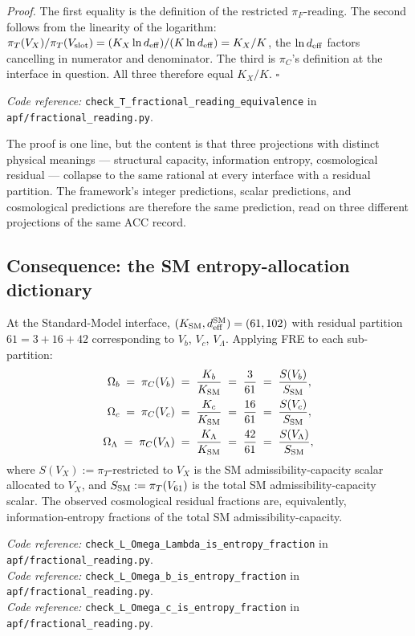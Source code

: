 \documentclass[11pt]{article}
\newcommand{\coderef}[2]{\smallskip\noindent\textit{Code reference:} \texttt{#1} in \texttt{#2}.}
\begin{document}
\noindent\textit{Proof.} The first equality is the definition of the restricted $\pi_F$-reading. The second follows from the linearity of the logarithm: $\pi_T(V_X)/\pi_T(V_{\rm slot}) = (K_X \ln d_{\rm eff})/(K \ln d_{\rm eff}) = K_X/K$, the $\ln d_{\rm eff}$ factors cancelling in numerator and denominator. The third is $\pi_C$'s definition at the interface in question. All three therefore equal $K_X/K$. \hfill$\square$

\smallskip

\coderef{check\_T\_fractional\_reading\_equivalence}{apf/fractional\_reading.py}

The proof is one line, but the content is that three projections with distinct physical meanings --- structural capacity, information entropy, cosmological residual --- collapse to the same rational at every interface with a residual partition. The framework's integer predictions, scalar predictions, and cosmological predictions are therefore the same prediction, read on three different projections of the same ACC record.

\subsection{Consequence: the SM entropy-allocation dictionary}\label{sec:FRE_SM_dictionary}

At the Standard-Model interface, $(K_{\rm SM}, d_{\rm eff}^{\rm SM}) = (61, 102)$ with residual partition $61 = 3 + 16 + 42$ corresponding to $V_b$, $V_c$, $V_\Lambda$. Applying FRE to each sub-partition:
\begin{align*}
\Omega_b       \;=\; \pi_C(V_b)       \;&=\; \frac{K_b}{K_{\rm SM}}       \;=\; \frac{3}{61}  \;=\; \frac{S(V_b)}{S_{\rm SM}}, \\
\Omega_c       \;=\; \pi_C(V_c)       \;&=\; \frac{K_c}{K_{\rm SM}}       \;=\; \frac{16}{61} \;=\; \frac{S(V_c)}{S_{\rm SM}}, \\
\Omega_\Lambda \;=\; \pi_C(V_\Lambda) \;&=\; \frac{K_\Lambda}{K_{\rm SM}} \;=\; \frac{42}{61} \;=\; \frac{S(V_\Lambda)}{S_{\rm SM}},
\end{align*}
where $S(V_X) := \pi_T$-restricted to $V_X$ is the SM admissibility-capacity scalar allocated to $V_X$, and $S_{\rm SM} := \pi_T(V_{61})$ is the total SM admissibility-capacity scalar. The observed cosmological residual fractions are, equivalently, information-entropy fractions of the total SM admissibility-capacity.

\coderef{check\_L\_Omega\_Lambda\_is\_entropy\_fraction}{apf/fractional\_reading.py}\\[-6pt]
\coderef{check\_L\_Omega\_b\_is\_entropy\_fraction}{apf/fractional\_reading.py}\\[-6pt]
\coderef{check\_L\_Omega\_c\_is\_entropy\_fraction}{apf/fractional\_reading.py}
\end{document}

